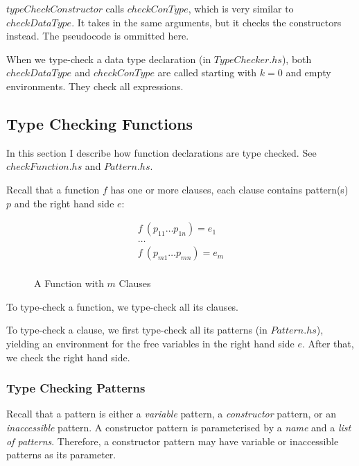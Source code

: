 $typeCheckConstructor$ calls $checkConType$, which is very similar to $checkDataType$. It takes in the same arguments, but it checks the constructors instead. The pseudocode is ommitted here.

When we type-check a data type declaration (in $TypeChecker.hs$), both $checkDataType$ and $checkConType$ are called starting with $k=0$ and empty environments. They check all expressions.

\subsection{Type Checking Functions}

In this section I describe how function declarations are type checked. See \emph{$checkFunction.hs$} and \emph{$Pattern.hs$}.

Recall that a function $f$ has one or more clauses, each clause contains pattern(s) $p$ and the right hand side $e$:

\begin{figure}[H]
  \begin{equation*}
    \begin{aligned}
      f \: (p_{11} \dots p_{1n}) = e_1 \\
      \dots                            \\
      f \: (p_{m1} \dots p_{mn}) = e_m \\
    \end{aligned}
  \end{equation*}
  \caption{A Function with $m$ Clauses}
\end{figure}

To type-check a function, we type-check all its clauses.

To type-check a clause, we first type-check all its patterns (in $Pattern.hs$), yielding an environment for the free variables in the right hand side $e$. After that, we check the right hand side.

\subsubsection{Type Checking Patterns}
\label{sec:typeCheckPattern}

Recall that a pattern is either a \emph{variable} pattern, a \emph{constructor} pattern, or an \emph{inaccessible} pattern. A constructor pattern is parameterised by a \emph{name} and a \emph{list of patterns}. Therefore, a constructor pattern may have variable or inaccessible patterns as its parameter.

